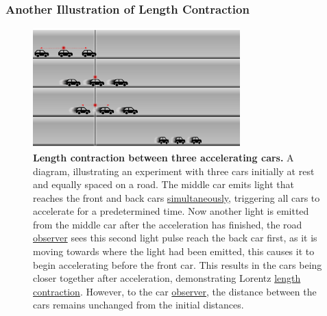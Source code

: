 

\subsubsection{Another Illustration of Length Contraction}

\begin{figure}[H]
	\centering
	\includegraphics[width = 8cm]{images/pdf/cars.pdf}
	\caption{\textbf{Length contraction between three accelerating cars.} A diagram, illustrating an experiment with three cars initially at rest and equally spaced on a road. The middle car emits light that reaches the front and back cars \protect\hyperlink{def-simultaneity}{simultaneously}, triggering all cars to accelerate for a predetermined time. Now another light is emitted from the middle car after the acceleration has finished, the road \protect\hyperlink{def-observer}{observer} sees this second light pulse reach the back car first, as it is moving towards where the light had been emitted, this causes it to begin accelerating before the front car. This results in the cars being closer together after acceleration, demonstrating Lorentz \protect\hyperlink{def-length-contraction}{length contraction}. However, to the car \protect\hyperlink{def-observer}{observer}, the distance between the cars remains unchanged from the initial distances.}
	\label{fig: cars}
\end{figure}

